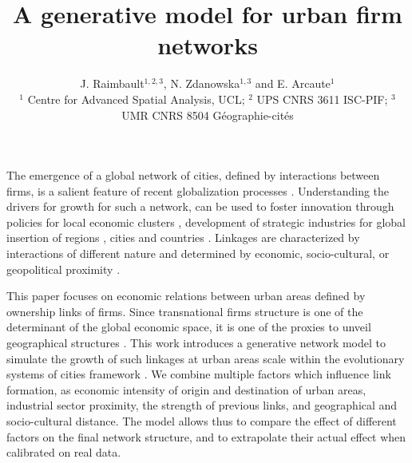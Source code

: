 \documentclass[10pt,letterpaper]{article}
\title{\vspace{-2.7cm}A generative model for urban firm networks}
\author{J. Raimbault$^{1,2,3}$, N. Zdanowska$^{1,3}$ and E. Arcaute$^1$\\\medskip\small
$^{1}$ Centre for Advanced Spatial Analysis, UCL; $^{2}$ UPS CNRS 3611 ISC-PIF; $^{3}$ UMR CNRS 8504 G{\'e}ographie-cit{\'e}s
}
\date{}
\begin{document}
\maketitle



\vspace{-0.5cm}

The emergence of a global network of cities, defined by interactions between firms, is a salient feature of recent globalization processes \cite{taylor2001specification}. Understanding the drivers for growth for such a network, can be used to foster innovation through policies for local economic clusters \cite{turkina2016structure}, development of strategic industries for global insertion of regions \cite{dawley2019creating}, cities \cite{gluckler2016relational} and countries \cite{martinus2019brokerage}. Linkages are characterized by interactions of different nature and determined by economic, socio-cultural, or geopolitical proximity \cite{martinus2018global}.


This paper focuses on economic relations between urban areas defined by ownership links of firms. Since transnational firms structure is one of the determinant of the global economic space, it is one of the proxies to unveil geographical structures \cite{2019arXiv191014652Z}. 
This work introduces a generative network model to simulate the growth of such linkages at urban areas scale within the evolutionary systems of cities framework \cite{pumain2018evolutionary}. We combine multiple factors which influence link formation, as economic intensity of origin and destination of urban areas, industrial sector proximity, the strength of previous links, and geographical and socio-cultural distance. The model allows thus to compare the effect of different factors on the final network structure, and to extrapolate their actual effect when calibrated on real data.
\end{document}
